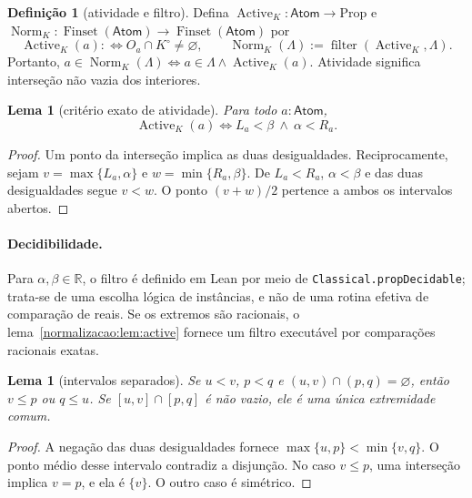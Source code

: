 \documentclass[12pt,a4paper]{article}
\theoremstyle{preciso}
\newtheorem{lema}[teorema]{Lema}
\theoremstyle{definition}
\newtheorem{definicao}[teorema]{Definição}
\newcommand{\R}{\mathbb R}
\newcommand{\Atoms}{\mathsf{Atom}}
\newcommand{\FS}{\operatorname{Finset}}
\newcommand{\Norm}{\operatorname{Norm}}
\newcommand{\Act}{\operatorname{Active}}
\newcommand{\code}[1]{\nolinkurl{#1}}
\theoremstyle{preciso}
\theoremstyle{preciso}
\theoremstyle{preciso}
\theoremstyle{preciso}
\theoremstyle{definition}
\theoremstyle{preciso}
\theoremstyle{definition}
\theoremstyle{preciso}
\theoremstyle{preciso}
\theoremstyle{definition}
\begin{document}
\begin{definicao}[atividade e filtro]\label{map:normalizacao:3.2}\label{normalizacao:def:norm}
Defina $\Act_K:\Atoms\to\mathrm{Prop}$ e
$\Norm_K:\FS(\Atoms)\to\FS(\Atoms)$ por
\[
 \Act_K(a):\Longleftrightarrow O_a\cap K^\circ\ne\varnothing,
 \qquad \Norm_K(\Lambda):=\operatorname{filter}(\Act_K,\Lambda).
\]
Portanto,
$a\in\Norm_K(\Lambda)\Longleftrightarrow a\in\Lambda\land\Act_K(a)$.
Atividade significa interseção não vazia dos interiores.
\end{definicao}

\begin{lema}[critério exato de atividade]\label{map:normalizacao:3.3}\label{normalizacao:lem:active}
Para todo $a:\Atoms$,
\[
 \Act_K(a)\Longleftrightarrow L_a<\beta\ \land\ \alpha<R_a.
\]
\end{lema}
\begin{proof}
Um ponto da interseção implica as duas desigualdades. Reciprocamente,
sejam $v=\max\{L_a,\alpha\}$ e $w=\min\{R_a,\beta\}$. De
$L_a<R_a$, $\alpha<\beta$ e das duas desigualdades segue $v<w$.
O ponto $(v+w)/2$ pertence a ambos os intervalos abertos.
\end{proof}

\paragraph{Decidibilidade.}
Para $\alpha,\beta\in\R$, o filtro é definido em Lean por meio de
\code{Classical.propDecidable}; trata-se de uma escolha lógica de
instâncias, e não de uma rotina efetiva de comparação de reais.
Se os extremos são racionais, o lema~\ref{normalizacao:lem:active} fornece um filtro
executável por comparações racionais exatas.

\begin{lema}[intervalos separados]\label{map:normalizacao:3.4}\label{normalizacao:lem:separated}
Se $u<v$, $p<q$ e $(u,v)\cap(p,q)=\varnothing$, então
$v\le p$ ou $q\le u$. Se $[u,v]\cap[p,q]$ é não vazio, ele é
uma única extremidade comum.
\end{lema}
\begin{proof}
A negação das duas desigualdades fornece
$\max\{u,p\}<\min\{v,q\}$. O ponto médio desse intervalo contradiz a
disjunção. No caso $v\le p$, uma interseção implica $v=p$, e
ela é $\{v\}$. O outro caso é simétrico.
\end{proof}
\end{document}
